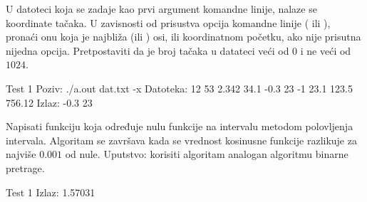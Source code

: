 \begin{Exercise}[label=405]
  U datoteci koja se zadaje kao prvi argument komandne linije, nalaze
  se koordinate tačaka. U zavisnosti od prisustva opcija komandne
  linije ( ili ), pronaći onu koja je najbliža
   (ili ) osi, ili koordinatnom početku, ako nije
  prisutna nijedna opcija. Pretpostaviti da je broj tačaka u datateci
  veći od $0$ i ne veći od $1024$.
  
\begin{miditest}
\begin{test}{Test 1}
Poziv: ./a.out dat.txt -x
Datoteka:
  12 53
  2.342 34.1
  -0.3 23
  -1 23.1
  123.5 756.12
Izlaz: -0.3 23
\end{test}
\end{miditest}


\end{Exercise}

\begin{Answer}[ref=405]
\end{Answer}
\begin{Exercise}[label=406]
  Napisati funkciju koja određuje nulu funkcije  na
  intervalu \argf{[0,2]} metodom polovljenja intervala. Algoritam se
  završava kada se vrednost kosinusne funkcije razlikuje za najviše
  $0.001$ od nule. Uputstvo: korisiti algoritam analogan algoritmu
  binarne pretrage.
  
  
\begin{minitest}
\begin{test}{Test 1}
Izlaz: 1.57031
\end{test}
\end{minitest}


\end{Exercise}

